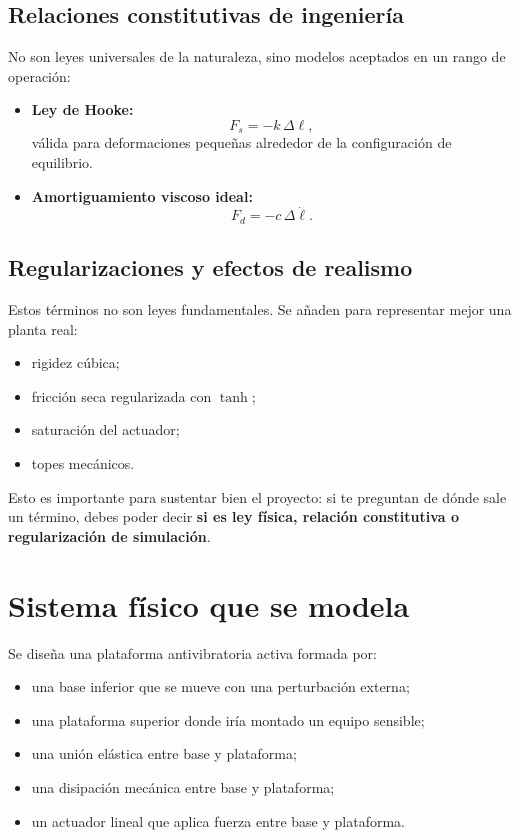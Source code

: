 \documentclass[11pt]{article}
\begin{document}
\subsection{Relaciones constitutivas de ingenier\'ia}

No son leyes universales de la naturaleza, sino modelos aceptados en un rango de operaci\'on:

\begin{itemize}[leftmargin=1.2cm]
\item \textbf{Ley de Hooke:}
\[
F_s = -k\,\Delta \ell,
\]
v\'alida para deformaciones peque\~nas alrededor de la configuraci\'on de equilibrio.
\item \textbf{Amortiguamiento viscoso ideal:}
\[
F_d = -c\,\Delta \dot{\ell}.
\]
\end{itemize}

\subsection{Regularizaciones y efectos de realismo}

Estos t\'erminos no son leyes fundamentales. Se a\~naden para representar mejor una planta real:

\begin{itemize}[leftmargin=1.2cm]
\item rigidez c\'ubica;
\item fricci\'on seca regularizada con $\tanh$;
\item saturaci\'on del actuador;
\item topes mec\'anicos.
\end{itemize}

Esto es importante para sustentar bien el proyecto: si te preguntan de d\'onde sale un t\'ermino, debes poder decir \textbf{si es ley f\'isica, relaci\'on constitutiva o regularizaci\'on de simulaci\'on}.

\section{Sistema f\'isico que se modela}

Se dise\~na una plataforma antivibratoria activa formada por:

\begin{itemize}[leftmargin=1.2cm]
\item una base inferior que se mueve con una perturbaci\'on externa;
\item una plataforma superior donde ir\'ia montado un equipo sensible;
\item una uni\'on el\'astica entre base y plataforma;
\item una disipaci\'on mec\'anica entre base y plataforma;
\item un actuador lineal que aplica fuerza entre base y plataforma.
\end{itemize}
\end{document}
